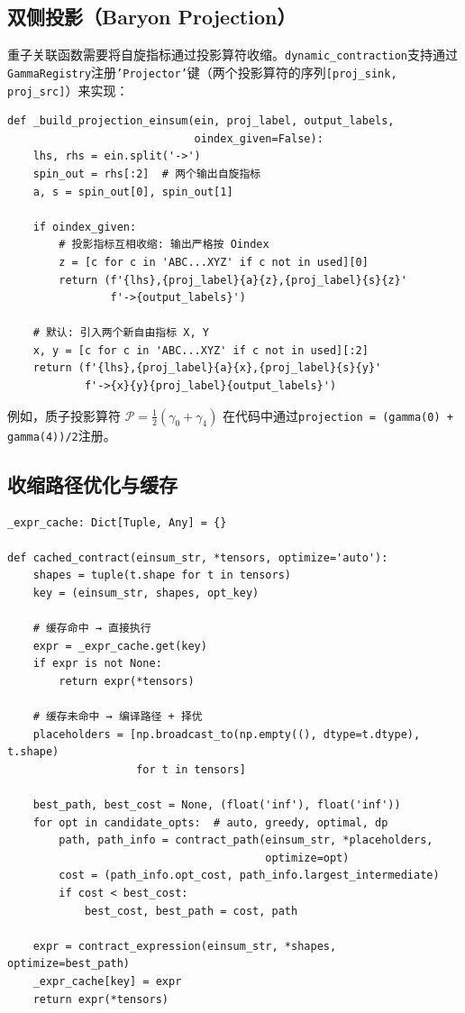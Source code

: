\documentclass[11pt,a4paper]{ctexart}
\begin{document}
\subsection{双侧投影（Baryon Projection）}

重子关联函数需要将自旋指标通过投影算符收缩。\texttt{dynamic\_contraction}支持通过\texttt{GammaRegistry}注册\texttt{'Projector'}键（两个投影算符的序列\texttt{[proj\_sink, proj\_src]}）来实现：

\begin{codebox}[双侧投影einsum构建]
\begin{lstlisting}[style=python]
def _build_projection_einsum(ein, proj_label, output_labels,
                             oindex_given=False):
    lhs, rhs = ein.split('->')
    spin_out = rhs[:2]  # 两个输出自旋指标
    a, s = spin_out[0], spin_out[1]

    if oindex_given:
        # 投影指标互相收缩: 输出严格按 Oindex
        z = [c for c in 'ABC...XYZ' if c not in used][0]
        return (f'{lhs},{proj_label}{a}{z},{proj_label}{s}{z}'
                f'->{output_labels}')

    # 默认: 引入两个新自由指标 X, Y
    x, y = [c for c in 'ABC...XYZ' if c not in used][:2]
    return (f'{lhs},{proj_label}{a}{x},{proj_label}{s}{y}'
            f'->{x}{y}{proj_label}{output_labels}')
\end{lstlisting}
\end{codebox}

例如，质子投影算符 $\mathcal{P} = \frac{1}{2}(\gamma_0 + \gamma_4)$ 在代码中通过\texttt{projection = (gamma(0) + gamma(4))/2}注册。

\subsection{收缩路径优化与缓存}

\begin{codebox}
\begin{lstlisting}[style=python]
_expr_cache: Dict[Tuple, Any] = {}

def cached_contract(einsum_str, *tensors, optimize='auto'):
    shapes = tuple(t.shape for t in tensors)
    key = (einsum_str, shapes, opt_key)

    # 缓存命中 → 直接执行
    expr = _expr_cache.get(key)
    if expr is not None:
        return expr(*tensors)

    # 缓存未命中 → 编译路径 + 择优
    placeholders = [np.broadcast_to(np.empty((), dtype=t.dtype), t.shape)
                    for t in tensors]

    best_path, best_cost = None, (float('inf'), float('inf'))
    for opt in candidate_opts:  # auto, greedy, optimal, dp
        path, path_info = contract_path(einsum_str, *placeholders,
                                        optimize=opt)
        cost = (path_info.opt_cost, path_info.largest_intermediate)
        if cost < best_cost:
            best_cost, best_path = cost, path

    expr = contract_expression(einsum_str, *shapes, optimize=best_path)
    _expr_cache[key] = expr
    return expr(*tensors)
\end{lstlisting}
\end{codebox}
\end{document}
